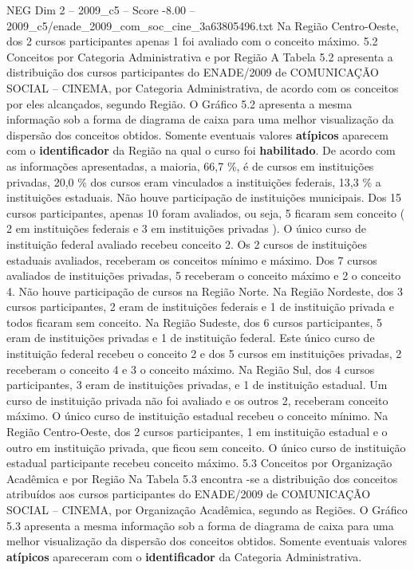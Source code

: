 \begin{textsample}{NEG Dim 2 – 2009\_c5 – Score -8.00 – 2009\_c5/enade\_2009\_com\_soc\_cine\_3a63805496.txt}
Na Região Centro-Oeste, dos 2 cursos participantes apenas 1 foi avaliado com o conceito máximo. 5.2 Conceitos por Categoria Administrativa e por Região A Tabela 5.2 apresenta a distribuição dos cursos participantes do ENADE/2009 de COMUNICAÇÃO SOCIAL – CINEMA, por Categoria Administrativa, de acordo com os conceitos por eles alcançados, segundo Região.
O Gráfico 5.2 apresenta a mesma informação sob a forma de diagrama de caixa para uma melhor visualização da dispersão dos conceitos obtidos.
Somente eventuais valores \textbf{atípicos} aparecem com o \textbf{identificador} da Região na qual o curso foi \textbf{habilitado}.
De acordo com as informações apresentadas, a maioria, 66,7 \%, é de cursos em instituições privadas, 20,0 \% dos cursos eram vinculados a instituições federais, 13,3 \% a instituições estaduais.
Não houve participação de instituições municipais.
Dos 15 cursos participantes, apenas 10 foram avaliados, ou seja, 5 ficaram sem conceito ( 2 em instituições federais e 3 em instituições privadas ).
O único curso de instituição federal avaliado recebeu conceito 2.
Os 2 cursos de instituições estaduais avaliados, receberam os conceitos mínimo e máximo.
Dos 7 cursos avaliados de instituições privadas, 5 receberam o conceito máximo e 2 o conceito 4.
Não houve participação de cursos na Região Norte.
Na Região Nordeste, dos 3 cursos participantes, 2 eram de instituições federais e 1 de instituição privada e todos ficaram sem conceito.
Na Região Sudeste, dos 6 cursos participantes, 5 eram de instituições privadas e 1 de instituição federal.
Este único curso de instituição federal recebeu o conceito 2 e dos 5 cursos em instituições privadas, 2 receberam o conceito 4 e 3 o conceito máximo.
Na Região Sul, dos 4 cursos participantes, 3 eram de instituições privadas, e 1 de instituição estadual.
Um curso de instituição privada não foi avaliado e os outros 2, receberam conceito máximo.
O único curso de instituição estadual recebeu o conceito mínimo.
Na Região Centro-Oeste, dos 2 cursos participantes, 1 em instituição estadual e o outro em instituição privada, que ficou sem conceito.
O único curso de instituição estadual participante recebeu conceito máximo. 5.3 Conceitos por Organização Acadêmica e por Região Na Tabela 5.3 encontra -se a distribuição dos conceitos atribuídos aos cursos participantes do ENADE/2009 de COMUNICAÇÃO SOCIAL – CINEMA, por Organização Acadêmica, segundo as Regiões.
O Gráfico 5.3 apresenta a mesma informação sob a forma de diagrama de caixa para uma melhor visualização da dispersão dos conceitos obtidos.
Somente eventuais valores \textbf{atípicos} apareceram com o \textbf{identificador} da Categoria Administrativa.

\end{textsample}

